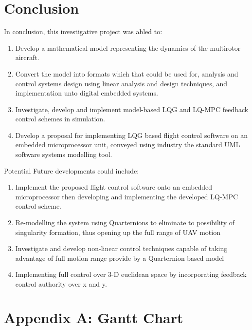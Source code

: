\documentclass[12pt,a4paper,twoside]{report}
\begin{document}
	\newpage
	
	\chapter{Conclusion}
		
		In conclusion, this investigative project was abled to:
		\begin{enumerate}
			\item
				Develop a mathematical model representing the dynamics of the multirotor aircraft.
			\item
				Convert the model into formats which that could be used for, analysis and control systems design using linear analysis and design techniques, and implementation unto digital embedded systems. 
			\item
				Investigate, develop and implement model-based LQG and LQ-MPC feedback control schemes in simulation.
			\item
				Develop a proposal for implementing LQG based flight control software on an embedded microprocessor unit, conveyed using industry the standard UML software systems modelling tool.
		\end{enumerate}
		Potential Future developments could include:
		\begin{enumerate}
			\item
				Implement the proposed flight control software onto an embedded microprocessor then developing and implementing the developed LQ-MPC control scheme.
			\item
				Re-modelling the system using Quarternions to eliminate to possibility of singularity formation, thus opening up the full range of UAV motion
			\item	
				Investigate and develop non-linear control techniques capable of taking advantage of full motion range provide by a Quarternion based model 
			\item	
				Implementing full control over 3-D euclidean space by incorporating feedback control authority over x and y. \cite{1}
			\end{enumerate}
	
	\newpage
	
				
	
	
	
	\newpage
	\chapter*{Appendix A: Gantt Chart}
		
\end{document}
